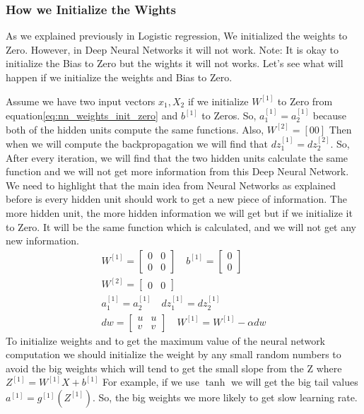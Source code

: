 \subsubsection{How we Initialize the Wights}

    As we explained previously in Logistic regression, We initialized the weights to Zero. However, in Deep Neural Networks it will not work. Note: It is okay to initialize the Bias to Zero but the wights it will not works. Let's see what will happen if we initialize the weights and Bias to Zero.

    
  Assume  we have two input vectors $x_1,X_2$ if we initialize $W^{[1]}$ to Zero from equation\eqref{eq:nn_weights_init_zero} and $b^{[1]}$ to Zeros. So, $a_1^{[1]}=a_2^{[1]}$ because both of the hidden units compute the same functions. Also, $W^{[2]}=[0 0]$ Then when we will compute the backpropagation we will find that $dz_1^{[1]}=dz_2^{[2]}$. So, After every iteration, we will find that the two hidden units calculate the same function and we will not get more information from this Deep Neural Network. We need to highlight that the main idea from Neural Networks as explained before is every hidden unit should work to get a new piece of information. The more hidden unit, the more hidden information we will get but if we initialize it to Zero. It will be the same function which is calculated, and we will not get any new information.%
\begin{subequations}\label{eq:nn_weights_init_zero}
\begin{align}
  W^{[1]} = \begin{bmatrix} 0 & 0\\ 0 & 0 \end{bmatrix} \quad b^{[1]} = \begin{bmatrix} 0 \\ 0 \end{bmatrix} \\
  W^{[2]} = \begin{bmatrix} 0 & 0 \end{bmatrix} \\
  a_1^{[1]} = a_2^{[1]} \quad     dz_1^{[1]} = dz_2^{[1]}\\
  dw = \begin{bmatrix} u & u \\ v & v \end{bmatrix} \quad W^{[1]} = W^{[1]} - \alpha dw
\end{align}
\end{subequations}%
To initialize weights and to get the maximum value of the neural network computation we should initialize the weight by any small random numbers to avoid the big weights which will tend to get the small slope from the Z where $Z^{[1]}= W^{[1]} X + b^{[1]}$ For example, if we use $\tanh$ we will get the big tail values $a^{[1]}= g^{[1]}(Z^{[1]})$. So, the big weights we more likely to get slow learning rate. 

